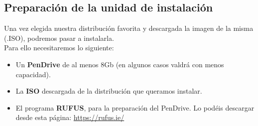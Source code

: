 \subsection{Preparación de la unidad de instalación}
Una vez elegida nuestra distribución favorita y descargada la imagen de la misma (.ISO), podremos pasar a instalarla.
\newline\\ Para ello necesitaremos lo siguiente:
\begin{itemize}
    \item Un \textbf{PenDrive} de al menos 8Gb (en algunos casos valdrá con menos capacidad).
    \item La \textbf{ISO} descargada de la distribución que queramos instalar.
    \item El programa \textbf{RUFUS}, para la preparación del PenDrive. 
    \newline Lo podéis descargar desde esta página: \url{https://rufus.ie/}
\end{itemize}

